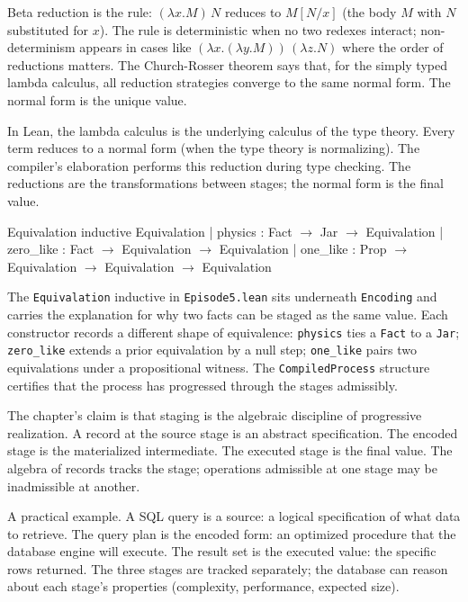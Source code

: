 Beta reduction is the rule: $(\lambda x. M) \, N$ reduces to $M[N/x]$
(the body $M$ with $N$ substituted for $x$). The rule is
deterministic when no two redexes interact; non-determinism appears
in cases like $(\lambda x. (\lambda y. M)) \, (\lambda z. N)$ where the
order of reductions matters. The Church-Rosser theorem says that, for
the simply typed lambda calculus, all reduction strategies converge to
the same normal form. The normal form is the unique value.

In Lean, the lambda calculus is the underlying calculus of the
type theory. Every term reduces to a normal form (when the type
theory is normalizing). The compiler's elaboration performs this
reduction during type checking. The reductions are the
transformations between stages; the normal form is the final
value.

\begin{leanexcerpt}{Equivalation}
inductive Equivalation
  | physics   : Fact $\to$ Jar $\to$ Equivalation
  | zero_like : Fact $\to$ Equivalation $\to$ Equivalation
  | one_like  : Prop $\to$ Equivalation $\to$ Equivalation
              $\to$ Equivalation
\end{leanexcerpt}

The \texttt{Equivalation} inductive in \texttt{Episode5.lean}
sits underneath \texttt{Encoding} and carries the explanation for
why two facts can be staged as the same value. Each constructor
records a different shape of equivalence: \texttt{physics} ties a
\texttt{Fact} to a \texttt{Jar}; \texttt{zero\_like} extends a
prior equivalation by a null step; \texttt{one\_like} pairs two
equivalations under a propositional witness. The
\texttt{CompiledProcess} structure certifies that the process has
progressed through the stages admissibly.

The chapter's claim is that staging is the algebraic discipline
of progressive realization. A record at the source stage is an
abstract specification. The encoded stage is the materialized
intermediate. The executed stage is the final value. The
algebra of records tracks the stage; operations admissible at
one stage may be inadmissible at another.

A practical example. A SQL query is a source: a logical
specification of what data to retrieve. The query plan is the
encoded form: an optimized procedure that the database engine
will execute. The result set is the executed value: the
specific rows returned. The three stages are tracked separately;
the database can reason about each stage's properties
(complexity, performance, expected size).

